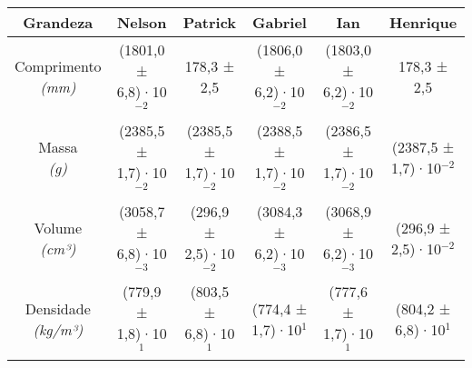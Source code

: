 \documentclass{article}
\begin{document}
\begin{table}[h!]
\centering
\begin{tabular}{c c c c c c }
\toprule
Grandeza & Nelson & Patrick & Gabriel & Ian & Henrique\\
\midrule
\shortstack{Comprimento\\\textit{(mm)}} & (1801,0 ± 6,8)·10$^{-2}$ & 178,3 ± 2,5 & (1806,0 ± 6,2)·10$^{-2}$ & (1803,0 ± 6,2)·10$^{-2}$ & 178,3 ± 2,5\\[4pt]
\shortstack{Massa\\\textit{(g)}} & (2385,5 ± 1,7)·10$^{-2}$ & (2385,5 ± 1,7)·10$^{-2}$ & (2388,5 ± 1,7)·10$^{-2}$ & (2386,5 ± 1,7)·10$^{-2}$ & (2387,5 ± 1,7)·10$^{-2}$\\[4pt]
\shortstack{Volume\\\textit{(cm³)}} & (3058,7 ± 6,8)·10$^{-3}$ & (296,9 ± 2,5)·10$^{-2}$ & (3084,3 ± 6,2)·10$^{-3}$ & (3068,9 ± 6,2)·10$^{-3}$ & (296,9 ± 2,5)·10$^{-2}$\\[4pt]
\shortstack{Densidade\\\textit{(kg/m³)}} & (779,9 ± 1,8)·10$^{1}$ & (803,5 ± 6,8)·10$^{1}$ & (774,4 ± 1,7)·10$^{1}$ & (777,6 ± 1,7)·10$^{1}$ & (804,2 ± 6,8)·10$^{1}$\\[4pt]
\bottomrule
\end{tabular}
\end{table}
\end{document}
